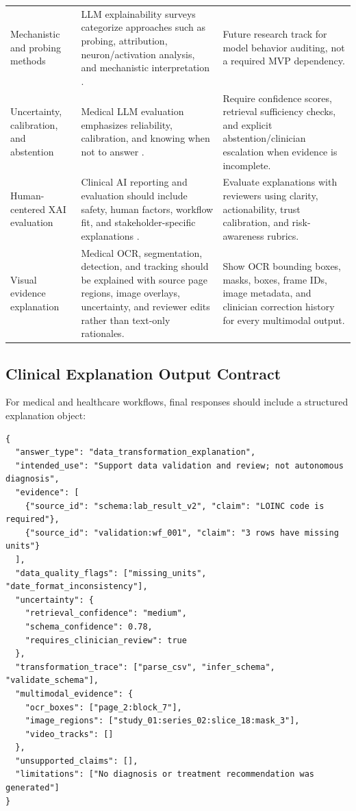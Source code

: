 \begin{longtable}{p{}p{}p{}}
\addlinespace
Mechanistic and probing methods & LLM explainability surveys categorize approaches such as probing, attribution, neuron/activation analysis, and mechanistic interpretation \cite{zhao2024llmExplainability}. & Future research track for model behavior auditing, not a required MVP dependency. \\
\addlinespace
Uncertainty, calibration, and abstention & Medical LLM evaluation emphasizes reliability, calibration, and knowing when not to answer \cite{chen2024medEval}. & Require confidence scores, retrieval sufficiency checks, and explicit abstention/clinician escalation when evidence is incomplete. \\
\addlinespace
Human-centered XAI evaluation & Clinical AI reporting and evaluation should include safety, human factors, workflow fit, and stakeholder-specific explanations \cite{vasey2022decide,fdaTransparency}. & Evaluate explanations with reviewers using clarity, actionability, trust calibration, and risk-awareness rubrics. \\
\addlinespace
Visual evidence explanation & Medical OCR, segmentation, detection, and tracking should be explained with source page regions, image overlays, uncertainty, and reviewer edits rather than text-only rationales. & Show OCR bounding boxes, masks, boxes, frame IDs, image metadata, and clinician correction history for every multimodal output. \\
\bottomrule
\end{longtable}

\subsection{Clinical Explanation Output Contract}

For medical and healthcare workflows, final responses should include a structured explanation object:

\begin{verbatim}
{
  "answer_type": "data_transformation_explanation",
  "intended_use": "Support data validation and review; not autonomous diagnosis",
  "evidence": [
    {"source_id": "schema:lab_result_v2", "claim": "LOINC code is required"},
    {"source_id": "validation:wf_001", "claim": "3 rows have missing units"}
  ],
  "data_quality_flags": ["missing_units", "date_format_inconsistency"],
  "uncertainty": {
    "retrieval_confidence": "medium",
    "schema_confidence": 0.78,
    "requires_clinician_review": true
  },
  "transformation_trace": ["parse_csv", "infer_schema", "validate_schema"],
  "multimodal_evidence": {
    "ocr_boxes": ["page_2:block_7"],
    "image_regions": ["study_01:series_02:slice_18:mask_3"],
    "video_tracks": []
  },
  "unsupported_claims": [],
  "limitations": ["No diagnosis or treatment recommendation was generated"]
}
\end{verbatim}

